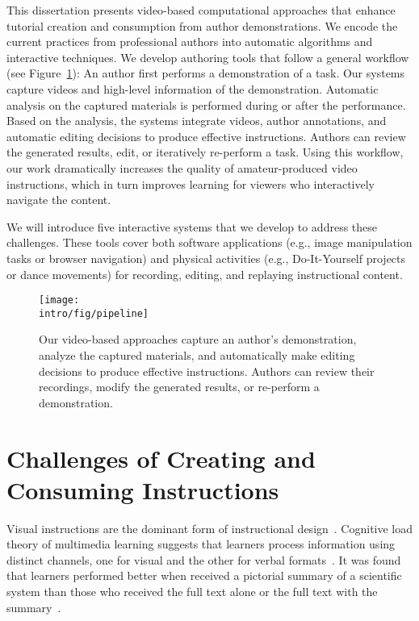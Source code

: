 This dissertation presents video-based computational approaches that enhance tutorial creation and consumption from author demonstrations.
We encode the current practices from professional authors into automatic algorithms and interactive techniques.
%
We develop authoring tools that follow a general workflow (see Figure~\ref{fig:general_pipeline}): An author first performs a demonstration of a task. Our systems capture videos and high-level information of the demonstration. Automatic analysis on the captured materials is performed during or after the performance. Based on the analysis, the systems integrate videos, author annotations, and automatic editing decisions to produce effective instructions. Authors can review the generated results, edit, or iteratively re-perform a task.
%
Using this workflow, our work dramatically increases the quality of amateur-produced video instructions, which in turn improves learning for viewers who interactively navigate the content.

We will introduce five interactive systems that we develop to address these challenges. These tools cover both software applications (e.g., image manipulation tasks or browser navigation) and physical activities (e.g., Do-It-Yourself projects or dance movements) for recording, editing, and replaying instructional content.

\begin{figure}[t!]
  \centering
  \texttt{[image: \\intro/fig/pipeline]}
  \caption{Our video-based approaches capture an author's demonstration, analyze the captured materials, and automatically make editing decisions to produce effective instructions. Authors can review their recordings, modify the generated results, or re-perform a demonstration.}
  \label{fig:general_pipeline}
\end{figure}


\section{Challenges of Creating and Consuming Instructions}

Visual instructions are the dominant form of instructional design~\cite{mijksenaar1999open}. Cognitive load theory of multimedia learning suggests that learners process information using distinct channels, one for visual and the other for verbal formats~\cite{sweller1998cognitive,sweller1988cognitive,paas2003cognitive}. It was found that learners performed better when received a pictorial summary of a scientific system than those who received the full text alone or the full text with the summary~\cite{mayer1996less}.

